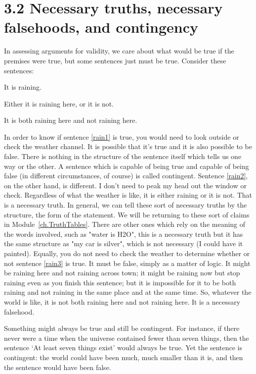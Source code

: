 \section{3.2 Necessary truths, necessary falsehoods, and contingency}
In assessing arguments for validity, we care about what would be true if the premises were true, but some sentences just must be true. Consider these sentences:
\begin{earg}
\item[\ex{rain1}] It is raining.
\item[\ex{rain2}] Either it is raining here, or it is not.
\item[\ex{rain3}] It is both raining here and not raining here.
\end{earg}
In order to know if sentence \ref{rain1} is true, you would need to look outside or check the weather channel. It is possible that it's true and it is also possible to be false. There is nothing in the structure of the sentence itself which tells us one way or the other. A sentence which is capable of being true and capable of being false (in different circumstances, of course) is called contingent. Sentence \ref{rain2}, on the other hand, is different. I don't need to peak my head out the window or check.  Regardless of what the weather is like, it is either raining or it is not. That is a necessary truth. In general, we can tell these sort of necessary truths by the structure, the form of the statement. We will be returning to these sort of claims in Module~\ref{ch.TruthTables}. There are other ones which rely on the meaning of the words involved, such as "water is H2O", this is a necessary truth but it has the same structure as "my car is silver", which is not necessary (I could have it painted). Equally, you do not need to check the weather to determine whether or not sentence \ref{rain3} is true. It must be false, simply as a matter of logic. It might be raining here and not raining across town; it might be raining now but stop raining even as you finish this sentence; but it is impossible for it to be both raining and not raining in the same place and at the same time. So, whatever the world is like, it is not both raining here and not raining here. It is a necessary falsehood.

Something might always be true and still be contingent. For instance, if there never were a time when the universe contained fewer than seven things, then the sentence ‘At least seven things exist’ would always be true. Yet the sentence is contingent: the world could have been much, much smaller than it is, and then the sentence would have been false.
